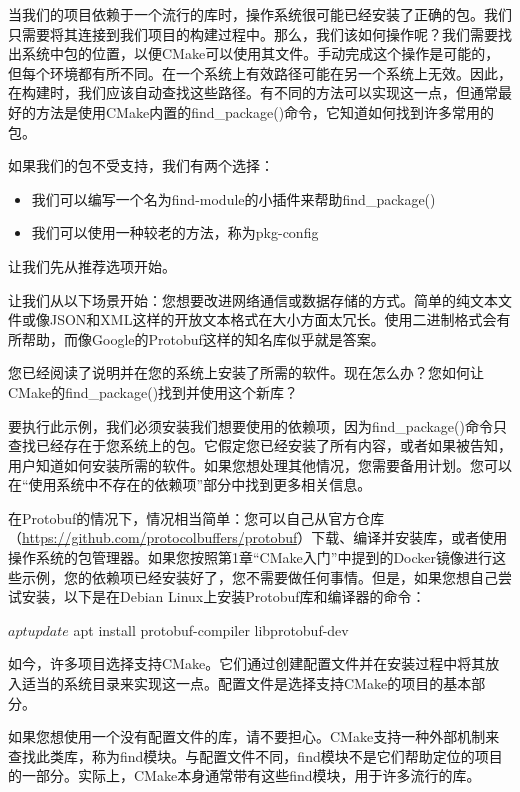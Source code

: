 
当我们的项目依赖于一个流行的库时，操作系统很可能已经安装了正确的包。我们只需要将其连接到我们项目的构建过程中。那么，我们该如何操作呢？我们需要找出系统中包的位置，以便CMake可以使用其文件。手动完成这个操作是可能的，但每个环境都有所不同。在一个系统上有效路径可能在另一个系统上无效。因此，在构建时，我们应该自动查找这些路径。有不同的方法可以实现这一点，但通常最好的方法是使用CMake内置的find\_package()命令，它知道如何找到许多常用的包。

如果我们的包不受支持，我们有两个选择：

\begin{itemize}
\item
我们可以编写一个名为find-module的小插件来帮助find\_package()

\item
我们可以使用一种较老的方法，称为pkg-config
\end{itemize}

让我们先从推荐选项开始。


让我们从以下场景开始：您想要改进网络通信或数据存储的方式。简单的纯文本文件或像JSON和XML这样的开放文本格式在大小方面太冗长。使用二进制格式会有所帮助，而像Google的Protobuf这样的知名库似乎就是答案。

您已经阅读了说明并在您的系统上安装了所需的软件。现在怎么办？您如何让CMake的find\_package()找到并使用这个新库？

要执行此示例，我们必须安装我们想要使用的依赖项，因为find\_package()命令只查找已经存在于您系统上的包。它假定您已经安装了所有内容，或者如果被告知，用户知道如何安装所需的软件。如果您想处理其他情况，您需要备用计划。您可以在“使用系统中不存在的依赖项”部分中找到更多相关信息。

在Protobuf的情况下，情况相当简单：您可以自己从官方仓库（\url{https://github.com/protocolbuffers/protobuf}）下载、编译并安装库，或者使用操作系统的包管理器。如果您按照第1章“CMake入门”中提到的Docker镜像进行这些示例，您的依赖项已经安装好了，您不需要做任何事情。但是，如果您想自己尝试安装，以下是在Debian Linux上安装Protobuf库和编译器的命令：

\begin{shell}
$ apt update
$ apt install protobuf-compiler libprotobuf-dev
\end{shell}

如今，许多项目选择支持CMake。它们通过创建配置文件并在安装过程中将其放入适当的系统目录来实现这一点。配置文件是选择支持CMake的项目的基本部分。

如果您想使用一个没有配置文件的库，请不要担心。CMake支持一种外部机制来查找此类库，称为find模块。与配置文件不同，find模块不是它们帮助定位的项目的一部分。实际上，CMake本身通常带有这些find模块，用于许多流行的库。

